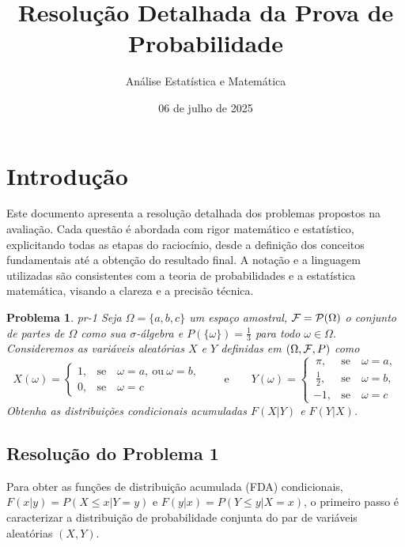\documentclass[
]{article}
\title{Resolução Detalhada da Prova de Probabilidade}
\author{Análise Estatística e Matemática}
\date{06 de julho de 2025}
\begin{document}
\maketitle

{
\setcounter{tocdepth}{2}
\tableofcontents
}
\newtheorem{problema}{Problema}
\renewcommand{\theproblema}{\arabic{problema}}

\section*{Introdução}

Este documento apresenta a resolução detalhada dos problemas propostos
na avaliação. Cada questão é abordada com rigor matemático e
estatístico, explicitando todas as etapas do raciocínio, desde a
definição dos conceitos fundamentais até a obtenção do resultado final.
A notação e a linguagem utilizadas são consistentes com a teoria de
probabilidades e a estatística matemática, visando a clareza e a
precisão técnica.

\begin{problema}{}{pr-1}
    Seja $\Omega = \{a, b, c\}$  um espaço amostral, ${\cal F}={\cal P}(\Omega)$ o conjunto de partes de $\Omega$ como sua $\sigma$-álgebra e $P(\{\omega\})=\frac{1}{3}$ para todo $\omega \in \Omega.$ Consideremos as variáveis aleatórias $X$ e $Y$ definidas em $(\Omega, {\cal F}, P)$ como
    $$
    X(\omega) =
    \begin{cases}
        1, &  \text{se}  \quad  \omega=a, \ \text{ou} \ \omega = b,  \\
        0, &  \text{se}  \quad  \omega=c
    \end{cases} 
    \qquad \text{e} \qquad 
    Y(\omega) =
    \begin{cases}
        \ \pi, &  \text{se}  \quad  \omega=a, \\
        \ \frac{1}{2}, &  \text{se}  \quad  \omega=b, \\
        -1, &  \text{se}  \quad  \omega=c
    \end{cases} 
    $$
    Obtenha as distribuições condicionais acumuladas $F(X|Y)$ e $F(Y|X)$.
\end{problema}

\subsection*{Resolução do Problema 1}

Para obter as funções de distribuição acumulada (FDA) condicionais,
\(F(x|y) = P(X \le x | Y=y)\) e \(F(y|x) = P(Y \le y | X=x)\), o
primeiro passo é caracterizar a distribuição de probabilidade conjunta
do par de variáveis aleatórias \((X, Y)\).
\end{document}
